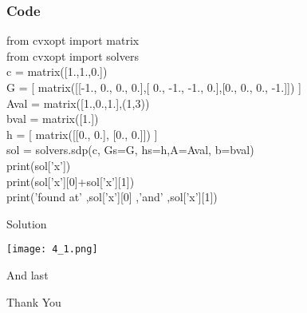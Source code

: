 \documentclass{beamer}
\begin{document}

\begin{frame}
\frametitle{Code}

from cvxopt import matrix\\
from cvxopt import solvers\\

c = matrix([1.,1.,0.])\\
G = [ matrix([[-1., 0., 0., 0.],[ 0., -1., -1., 0.],[0.,  0.,  0., -1.]]) ]\\

Aval = matrix([1.,0.,1.],(1,3))\\
bval = matrix([1.])\\

h = [ matrix([[0., 0.], [0., 0.]]) ]\\
sol = solvers.sdp(c, Gs=G, hs=h,A=Aval, b=bval)\\
print(sol['x'])  \\
print(sol['x'][0]+sol['x'][1]) \\
print('found at' ,sol['x'][0] ,'and' ,sol['x'][1]) \\


 

\end{frame}
\begin{frame}{Solution}
\begin{center}
    \texttt{[image: 4\_1.png]}
\end{center}
\end{frame}









\begin{frame}{And last}
\begin{center}
    Thank You
\end{center}
\end{frame}
\end{document}
